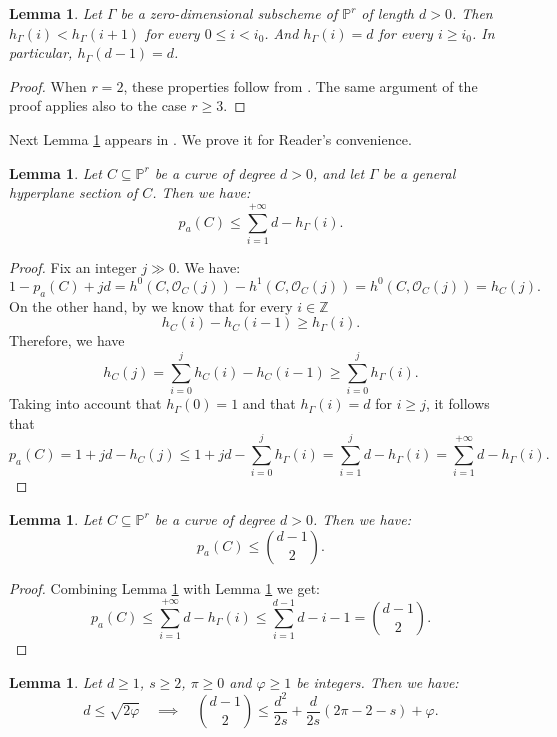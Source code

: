 \documentclass[9pt,a4paper]{amsart}
\theoremstyle{plain}
\newtheorem{lemma}[theorem]{Lemma}
\theoremstyle{definition}
\theoremstyle{remark}
\begin{document}
\smallskip
\begin{lemma}\label{hilbseziperp}
Let $\Gamma$ be a zero-dimensional subscheme of $\mathbb P^r$ of
length $d>0$. Then $h_{\Gamma}(i)< h_{\Gamma}(i+1)$ for every $0\leq
i<i_0$. And $h_{\Gamma}(i)=d$ for every $i\geq i_0$. In particular,
$h_{\Gamma}(d-1)=d$.
\end{lemma}

\begin{proof} When $r=2$, these properties follow from \cite[Proof of Proposition 1.1 and Corollary
1.2]{H}. The same argument of the proof applies also to the case
$r\geq 3$.
\end{proof}


Next Lemma \ref{riduzioneseziperp} appears in \cite[Corollary 3.2, p. 84]{EH}. We
prove it for Reader's convenience.

\smallskip
\begin{lemma}\label{riduzioneseziperp}
Let $C\subseteq \mathbb P^r$ be a curve of degree $d>0$, and let
$\Gamma$ be a general hyperplane section of $C$. Then we have:
$$
p_a(C)\leq \sum_{i=1}^{+\infty}d-h_{\Gamma}(i).
$$
\end{lemma}

\begin{proof}
Fix an integer $j \gg 0$.  We have:
$$
1-p_a(C)+jd=h^0(C,\mathcal O_C(j))-h^1(C,\mathcal
O_C(j))=h^0(C,\mathcal O_C(j))=h_{C}(j).
$$
On the other hand, by \cite[Lemma 3.1, p. 83]{EH} we know that for
every $i\in \mathbb Z$
$$
h_{C}(i)-h_{C}(i-1)\geq h_{\Gamma}(i).
$$
Therefore, we have
$$
h_C(j)=\sum_{i=0}^{j}h_C(i)-h_C(i-1)\geq
\sum_{i=0}^{j}h_{\Gamma}(i).
$$
Taking into account that $h_{\Gamma}(0)=1$ and that
$h_{\Gamma}(i)=d$ for $i\geq j$, it follows that
$$
p_a(C)=1+jd-h_C(j)\leq
1+jd-\sum_{i=0}^{j}h_{\Gamma}(i)=\sum_{i=1}^{j}d-h_{\Gamma}(i)=\sum_{i=1}^{+\infty}d-h_{\Gamma}(i).
$$
\end{proof}


\smallskip
\begin{lemma}\label{planegenus}
Let $C\subseteq \mathbb P^r$ be a curve of degree $d>0$. Then we
have:
$$
p_a(C)\leq \binom{d-1}{2}.
$$
\end{lemma}

\begin{proof} Combining Lemma \ref{riduzioneseziperp} with Lemma
\ref{hilbseziperp} we get:
$$
p_a(C)\leq \sum_{i=1}^{+\infty}d-h_{\Gamma}(i)\leq
\sum_{i=1}^{d-1}d-i-1=\binom{d-1}{2}.
$$
\end{proof}


\medskip
\begin{lemma}\label{trecarte} Let $d\geq 1$, $s\geq 2$, $\pi\geq 0$ and $\varphi\geq 1$ be integers. Then we have:
$$
d\leq \sqrt{2\varphi}\quad \implies \quad \binom{d-1}{2}\leq
\frac{d^2}{2s}+\frac{d}{2s}(2\pi-2-s)+\varphi.
$$
\end{lemma}
\end{document}
